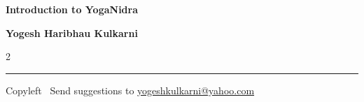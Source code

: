 \documentclass[9pt,a4paper,landscape]{article}
\begin{document}
\footnotesize


\begin{center}
\Large{\textbf{Introduction to YogaNidra}}  

\small{\textbf{Yogesh Haribhau Kulkarni}}  
\end{center}

\begin{multicols}{2}

\end{multicols}

\rule{\linewidth}{0.25pt}
\scriptsize
Copyleft \textcopyleft\  Send suggestions to 
\href{http://www.yogeshkulkarni.com}{yogeshkulkarni@yahoo.com}
\end{document}
